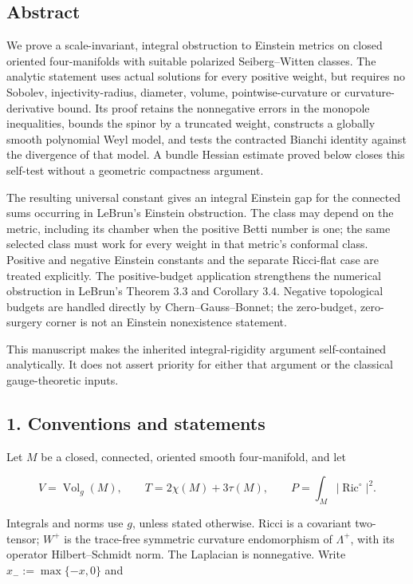 \documentclass[
  10pt,
]{article}
\begin{document}
\hypertarget{abstract}{%
\subsection{Abstract}\label{abstract}}

We prove a scale-invariant, integral obstruction to Einstein metrics on
closed oriented four-manifolds with suitable polarized Seiberg--Witten
classes. The analytic statement uses actual solutions for every positive
weight, but requires no Sobolev, injectivity-radius, diameter, volume,
pointwise-curvature or curvature-derivative bound. Its proof retains the
nonnegative errors in the monopole inequalities, bounds the spinor by a
truncated weight, constructs a globally smooth polynomial Weyl model,
and tests the contracted Bianchi identity against the divergence of that
model. A bundle Hessian estimate proved below closes this self-test
without a geometric compactness argument.

The resulting universal constant gives an integral Einstein gap for the
connected sums occurring in LeBrun's Einstein obstruction. The class may
depend on the metric, including its chamber when the positive Betti
number is one; the same selected class must work for every weight in
that metric's conformal class. Positive and negative Einstein constants
and the separate Ricci-flat case are treated explicitly. The
positive-budget application strengthens the numerical obstruction in
LeBrun's Theorem 3.3 and Corollary 3.4. Negative topological budgets are
handled directly by Chern--Gauss--Bonnet; the zero-budget, zero-surgery
corner is not an Einstein nonexistence statement.

This manuscript makes the inherited integral-rigidity argument
self-contained analytically. It does not assert priority for either that
argument or the classical gauge-theoretic inputs.

\hypertarget{conventions-and-statements}{%
\subsection{1. Conventions and
statements}\label{conventions-and-statements}}

Let \(M\) be a closed, connected, oriented smooth four-manifold, and let

\[
 V=\operatorname{Vol}_g(M),\qquad T=2\chi(M)+3\tau(M),\qquad
 P=\int_M|\operatorname{Ric}^{\circ}|^2.
\]

Integrals and norms use \(g\), unless stated otherwise. Ricci is a
covariant two-tensor; \(W^+\) is the trace-free symmetric curvature
endomorphism of \(\Lambda^+\), with its operator Hilbert--Schmidt norm.
The Laplacian is nonnegative. Write \(x_-:=\max\{-x,0\}\) and
\end{document}
